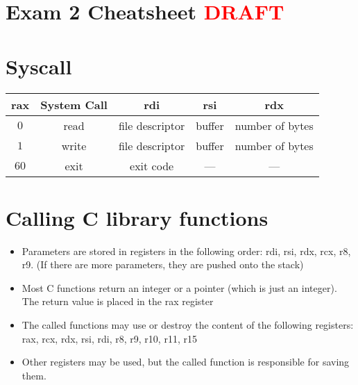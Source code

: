 \documentclass[letterpaper,12pt]{exam}
\newcommand{\unit}{Exam 2 Cheatsheet \textcolor{red}{DRAFT}}
\begin{document}
\section*{\unit}
\section*{Syscall}
\begin{tabular}{| c | c | c | c| c |}
 \hline
    rax & System Call & rdi & rsi & rdx \\
    \hline
    $0$ & read & file descriptor & buffer & number of bytes \\
    \hline
    $1$ & write & file descriptor & buffer & number of bytes \\
    \hline
    $60$ & exit & exit code & --- & --- \\
    \hline
\end{tabular}
\par
\section*{Calling C library functions}

\begin{itemize}
    \item Parameters are stored in registers in the following order: rdi, rsi, rdx, rcx, r8, r9. (If there are more parameters, they are pushed onto the stack)
    \item Most C functions return an integer or a pointer (which is just an integer).  The return value is placed in the rax register
    \item The called functions may use or destroy the content of the following registers: rax, rcx, rdx, rsi, rdi, r8, r9, r10, r11, r15 
    \item Other registers may be used, but the called function is responsible for saving them.
\vspace{5 mm}

\end{itemize}
\par
\end{document}
